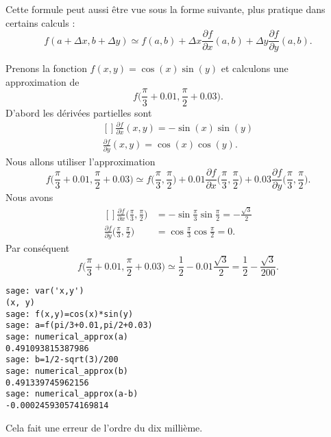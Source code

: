 Cette formule peut aussi être vue sous la forme suivante, plus pratique dans certains calculs :
\begin{equation}        \label{EqFormApproxfxyabDF}
    f(a+\Delta x,b+\Delta y)\simeq f(a,b)+\Delta x\frac{ \partial f }{ \partial x }(a,b)+\Delta y\frac{ \partial f }{ \partial y }(a,b).
\end{equation}

\begin{example}
    Prenons la fonction $f(x,y)=\cos(x)\sin(y)$ et calculons une approximation de
    \begin{equation}
        f\big( \frac{ \pi }{ 3 }+0.01,\frac{ \pi }{ 2 }+0.03 \big).
    \end{equation}
    D'abord les dérivées partielles sont
    \begin{equation}
        \begin{aligned}[]
            \frac{ \partial f }{ \partial x }(x,y)=-\sin(x)\sin(y)\\
            \frac{ \partial f }{ \partial y }(x,y)=\cos(x)\cos(y).
        \end{aligned}
    \end{equation}
    Nous allons utiliser l'approximation
    \begin{equation}
        f\big( \frac{ \pi }{ 3 }+0.01,\frac{ \pi }{ 2 }+0.03 \big)\simeq f\big( \frac{ \pi }{ 3 },\frac{ \pi }{2} \big)+0.01\frac{ \partial f }{ \partial x }\big( \frac{ \pi }{ 3 },\frac{ \pi }{2} \big)+0.03\frac{ \partial f }{ \partial y }\big( \frac{ \pi }{ 3 },\frac{ \pi }{2} \big).
    \end{equation}
    Nous avons
    \begin{equation}
        \begin{aligned}[]
            \frac{ \partial f }{ \partial x }\big( \frac{ \pi }{ 3 },\frac{ \pi }{2} \big)&=-\sin\frac{ \pi }{ 3 }\sin\frac{ \pi }{ 2 }=-\frac{ \sqrt{3} }{2}\\
            \frac{ \partial f }{ \partial y }\big( \frac{ \pi }{ 3 },\frac{ \pi }{2} \big)&=\cos\frac{ \pi }{ 3 }\cos\frac{ \pi }{ 2 }=0.
        \end{aligned}
    \end{equation}
    Par conséquent
    \begin{equation}
        f\big( \frac{ \pi }{ 3 }+0.01,\frac{ \pi }{ 2 }+0.03 \big)\simeq \frac{ 1 }{2}-0.01\frac{ \sqrt{3} }{2}=\frac{ 1 }{2}-\frac{ \sqrt{3} }{ 200 }. 
    \end{equation}
    
    \begin{verbatim}
sage: var('x,y')
(x, y)
sage: f(x,y)=cos(x)*sin(y)
sage: a=f(pi/3+0.01,pi/2+0.03)
sage: numerical_approx(a)
0.491093815387986
sage: b=1/2-sqrt(3)/200
sage: numerical_approx(b)
0.491339745962156
sage: numerical_approx(a-b)
-0.000245930574169814
    \end{verbatim}
    Cela fait une erreur de l'ordre du dix millième. 
    
\end{example}

